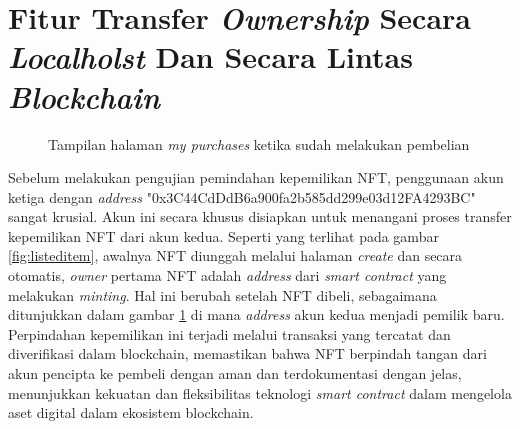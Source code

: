 \section{Fitur Transfer \emph{Ownership} Secara \emph{Localholst} Dan Secara Lintas \emph{Blockchain}}
\begin{figure} [H] \centering
  \caption{Tampilan halaman \emph{my purchases} ketika sudah melakukan pembelian}
  \label{fig:address_nft_b_1}
  \end{figure}

Sebelum melakukan pengujian pemindahan kepemilikan NFT, penggunaan akun ketiga dengan \emph{address} "0x3C44CdDdB6a900fa2b585dd299e03d12FA4293BC" sangat krusial. Akun ini secara khusus disiapkan untuk menangani proses transfer kepemilikan NFT dari akun kedua. Seperti yang terlihat pada gambar \ref*{fig:listeditem}, awalnya NFT diunggah melalui halaman \emph{create} dan secara otomatis, \emph{owner} pertama NFT adalah \emph{address} dari \emph{smart contract} yang melakukan \emph{minting}. Hal ini berubah setelah NFT dibeli, sebagaimana ditunjukkan dalam gambar \ref{fig:address_nft_b_1} di mana \emph{address} akun kedua menjadi pemilik baru. Perpindahan kepemilikan ini terjadi melalui transaksi yang tercatat dan diverifikasi dalam blockchain, memastikan bahwa NFT berpindah tangan dari akun pencipta ke pembeli dengan aman dan terdokumentasi dengan jelas, menunjukkan kekuatan dan fleksibilitas teknologi \emph{smart contract} dalam mengelola aset digital dalam ekosistem blockchain.

